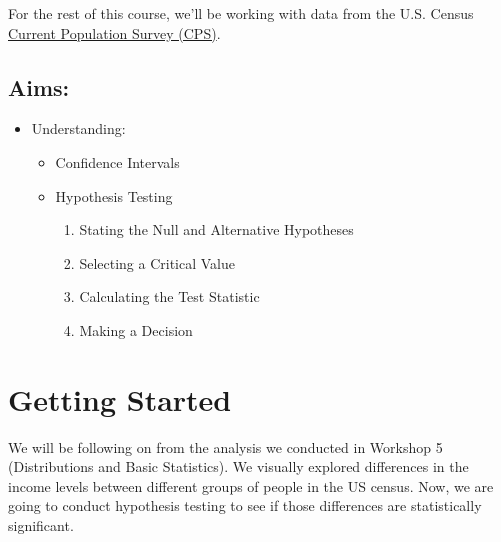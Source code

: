 \documentclass[
  letterpaper,
  DIV=11,
  numbers=noendperiod]{scrreprt}
\providecommand{\tightlist}{%
  \setlength{\itemsep}{0pt}\setlength{\parskip}{0pt}}\usepackage{longtable,booktabs,array}
\begin{document}
For the rest of this course, we'll be working with data from the U.S.
Census \href{https://www.census.gov/programs-surveys/cps.html}{Current
Population Survey (CPS)}.

\hypertarget{aims-4}{%
\subsection{Aims:}\label{aims-4}}

\begin{itemize}
\tightlist
\item
  Understanding:

  \begin{itemize}
  \tightlist
  \item
    Confidence Intervals
  \item
    Hypothesis Testing

    \begin{enumerate}
    \def\labelenumi{\arabic{enumi}.}
    \tightlist
    \item
      Stating the Null and Alternative Hypotheses
    \item
      Selecting a Critical Value
    \item
      Calculating the Test Statistic
    \item
      Making a Decision
    \end{enumerate}
  \end{itemize}
\end{itemize}

\hypertarget{getting-started-2}{%
\section{Getting Started}\label{getting-started-2}}

We will be following on from the analysis we conducted in Workshop 5
(Distributions and Basic Statistics). We visually explored differences
in the income levels between different groups of people in the US
census. Now, we are going to conduct hypothesis testing to see if those
differences are statistically significant.
\end{document}
